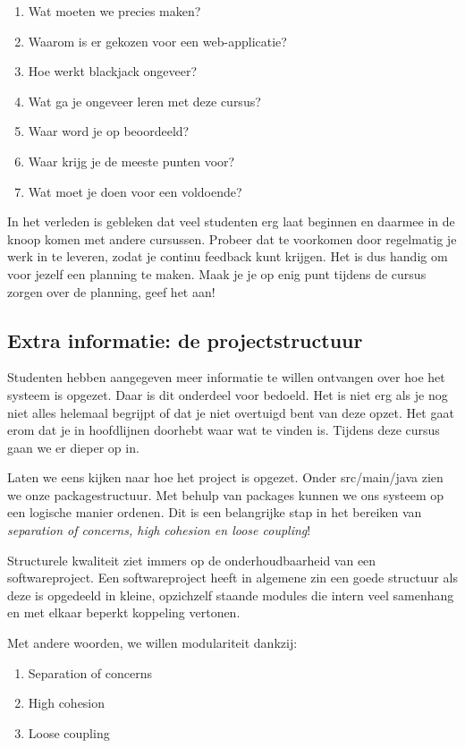 \begin{enumerate}
    \item Wat moeten we precies maken?
    \item Waarom is er gekozen voor een web-applicatie?
    \item Hoe werkt blackjack ongeveer?
    \item Wat ga je ongeveer leren met deze cursus?
    \item Waar word je op beoordeeld?
    \item Waar krijg je de meeste punten voor?
    \item Wat moet je doen voor een voldoende?
\end{enumerate}

In het verleden is gebleken dat veel studenten erg laat beginnen 
en daarmee in de knoop komen met andere cursussen. Probeer dat te 
voorkomen door regelmatig je werk in te leveren, zodat je continu feedback 
kunt krijgen. Het is dus handig om voor jezelf een planning te maken.
Maak je je op enig punt tijdens de cursus zorgen over de planning,
geef het aan!

\subsection{Extra informatie: de projectstructuur}
Studenten hebben aangegeven meer informatie te willen ontvangen over hoe het 
systeem is opgezet. Daar is dit onderdeel voor bedoeld. Het is niet 
erg als je nog niet alles helemaal begrijpt of dat je niet overtuigd 
bent van deze opzet. Het gaat erom dat je in hoofdlijnen doorhebt 
waar wat te vinden is. Tijdens deze cursus gaan we er dieper op in.

Laten we eens kijken naar hoe het project is opgezet.
Onder src/main/java zien we onze packagestructuur.
Met behulp van packages kunnen we ons systeem op een logische manier 
ordenen. Dit is een belangrijke stap in het bereiken van 
\textit{separation of concerns, high cohesion en loose coupling}!

Structurele kwaliteit ziet immers op de onderhoudbaarheid
van een softwareproject. Een softwareproject heeft in algemene zin 
een goede structuur als deze is opgedeeld in kleine,
opzichzelf staande modules die intern veel samenhang 
en met elkaar beperkt koppeling vertonen.

Met andere woorden, we willen modulariteit dankzij:
\begin{enumerate}
    \item Separation of concerns
    \item High cohesion
    \item Loose coupling
\end{enumerate}

